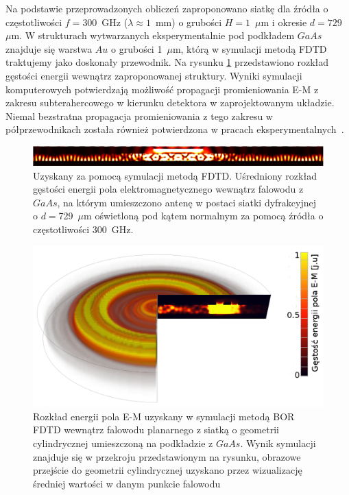 Na podstawie przeprowadzonych obliczeń zaproponowano siatkę dla źródła o częstotliwości $f=300$~GHz ($\lambda\approx 1$~mm) o grubości $H=1$~$\mu$m i okresie $d=729$~$\mu$m. W strukturach wytwarzanych eksperymentalnie pod podkładem $GaAs$ znajduje się warstwa $Au$ o grubości 1~$\mu$m, którą w symulacji metodą FDTD traktujemy jako doskonały przewodnik. Na rysunku \ref{fig:consrc_1d_f300Ghz} przedstawiono rozkład gęstości energii wewnątrz zaproponowanej struktury. Wyniki symulacji komputerowych potwierdzają  możliwość propagacji promieniowania E-M z zakresu subterahercowego w kierunku detektora w zaprojektowanym układzie. Niemal bezstratna propagacja promieniowania z tego zakresu w półprzewodnikach została również potwierdzona w pracach eksperymentalnych~\cite{roux2002grating}.

\begin{figure}[tb]
	\includegraphics[width=\textwidth]{images/thz/consrc_siatka1d_300GHz_d729um.png}
	\caption{Uzyskany za pomocą symulacji metodą FDTD. Uśredniony rozkład gęstości energii pola elektromagnetycznego wewnątrz falowodu z $GaAs$, na którym umieszczono antenę w postaci siatki dyfrakcyjnej o $d=$729~$\mu$m oświetloną pod kątem normalnym za pomocą źródła o częstotliwości 300~GHz.  }
	\label{fig:consrc_1d_f300Ghz}
\end{figure}

\begin{figure}[tb]
	\includegraphics[width=\textwidth]{images/antenaThz/tort.png}
	\caption{Rozkład energii pola E-M uzyskany w symulacji metodą BOR FDTD wewnątrz falowodu planarnego z siatką o geometrii cylindrycznej umieszczoną na podkładzie z $GaAs$. Wynik symulacji znajduje się w przekroju przedstawionym na rysunku, obrazowe przejście do geometrii cylindrycznej uzyskano przez wizualizację średniej wartości w danym punkcie falowodu}	
	\label{fig:concent_modfalo}
\end{figure}

